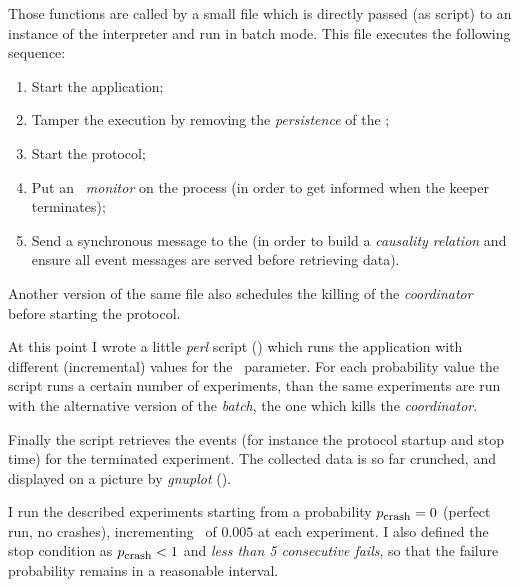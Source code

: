 Those functions are called by a small file which is directly passed (as
script) to an instance of the interpreter and run in batch mode. This file
executes the following sequence:
\begin{enumerate}
\item   Start the application;
\item   Tamper the execution by removing the \emph{persistence} of the
        ;
\item   Start the protocol;
\item   Put an \emph{\Erlang\ monitor} on the  process
        (in order to get informed when the keeper terminates);
\item   Send a synchronous message to the  (in
        order to build a \emph{causality relation} and ensure all event
        messages are served before retrieving data).
\end{enumerate}

Another version of the same file also schedules the killing of the
\emph{coordinator} before starting the protocol.

At this point I wrote a little \emph{perl} script
() which runs the application with different
(incremental) values for the \PCrash\ parameter. For each probability
value the script runs a certain number of experiments, than the same
experiments are run with the alternative version of the \emph{batch}, the
one which kills the \emph{coordinator}.

Finally the script retrieves the events (for instance the protocol
startup and stop time) for the terminated experiment. The collected data
is so far crunched, and displayed on a picture by \emph{gnuplot}
().


I run the described experiments starting from a probability ${p}_{\mbox{\footnotesize{crash}}} = 0$
(perfect run, no crashes), incrementing \PCrash\ of $0.005$ at each
experiment. I also defined the stop condition as ${p}_{\mbox{\footnotesize{crash}}} < 1$ and
\emph{less than 5 consecutive fails}, so that the failure probability
remains in a reasonable interval.

